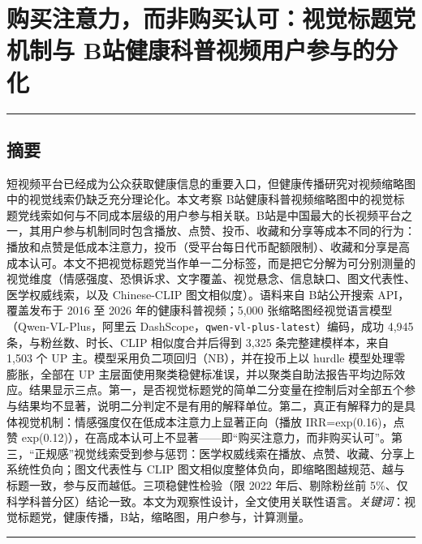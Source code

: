 \documentclass[
  fontset=none]{ctexart}
\author{}
\date{}
\begin{document}
\section{购买注意力，而非购买认可：视觉标题党机制与 B站健康科普视频用户参与的分化}\label{ux8d2dux4e70ux6ce8ux610fux529bux800cux975eux8d2dux4e70ux8ba4ux53efux591aux6a21ux6001ux6807ux9898ux515aux4e0e-bux7ad9ux5065ux5eb7ux79d1ux666eux89c6ux9891ux7528ux6237ux53c2ux4e0eux7684ux5206ux5316}

\begin{center}\rule{0.5\linewidth}{0.5pt}\end{center}

\subsection{摘要}\label{ux6458ux8981}

短视频平台已经成为公众获取健康信息的重要入口，但健康传播研究对视频缩略图中的视觉线索仍缺乏充分理论化。本文考察 B站健康科普视频缩略图中的视觉标题党线索如何与不同成本层级的用户参与相关联。B站是中国最大的长视频平台之一，其用户参与机制同时包含播放、点赞、投币、收藏和分享等成本不同的行为：播放和点赞是低成本注意力，投币（受平台每日代币配额限制）、收藏和分享是高成本认可。本文不把视觉标题党当作单一二分标签，而是把它分解为可分别测量的视觉维度（情感强度、恐惧诉求、文字覆盖、视觉悬念、信息缺口、图文代表性、医学权威线索，以及 Chinese-CLIP 图文相似度）。语料来自 B站公开搜索 API，覆盖发布于 2016 至 2026 年的健康科普视频；5,000 张缩略图经视觉语言模型（Qwen-VL-Plus，阿里云 DashScope，\texttt{qwen-vl-plus-latest}）编码，成功 4,945 条，与粉丝数、时长、CLIP 相似度合并后得到 3,325 条完整建模样本，来自 1,503 个 UP 主。模型采用负二项回归（NB），并在投币上以 hurdle 模型处理零膨胀，全部在 UP 主层面使用聚类稳健标准误，并以聚类自助法报告平均边际效应。结果显示三点。第一，是否视觉标题党的简单二分变量在控制后对全部五个参与结果均不显著，说明二分判定不是有用的解释单位。第二，真正有解释力的是具体视觉机制：情感强度仅在低成本注意力上显著正向（播放 IRR=exp(0.16)，点赞 exp(0.12)），在高成本认可上不显著——即``购买注意力，而非购买认可''。第三，``正规感''视觉线索受到参与惩罚：医学权威线索在播放、点赞、收藏、分享上系统性负向；图文代表性与 CLIP 图文相似度整体负向，即缩略图越规范、越与标题一致，参与反而越低。三项稳健性检验（限 2022 年后、剔除粉丝前 5\%、仅科学科普分区）结论一致。本文为观察性设计，全文使用关联性语言。\emph{关键词}：视觉标题党，健康传播，B站，缩略图，用户参与，计算测量。

\begin{center}\rule{0.5\linewidth}{0.5pt}\end{center}
\end{document}
